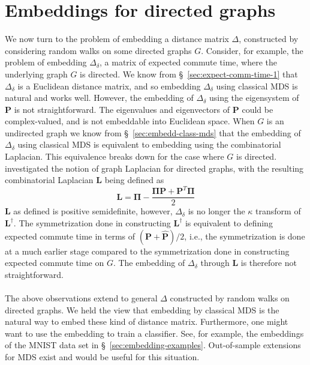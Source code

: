 \section{Embeddings for directed graphs}
\label{sec:embedd-dist-direct}
We now turn to the problem of embedding a distance matrix $\Delta$,
constructed by considering random walks on some directed graphs
$G$. Consider, for example, the problem of embedding $\Delta_{\delta}$,
a matrix of expected commute time, where the underlying graph $G$ is
directed. We know from \S~\ref{sec:expect-comm-time-1} that
$\Delta_{\delta}$ is a Euclidean distance matrix, and so embedding
$\Delta_\delta$ using classical MDS is natural and works
well. However, the embedding of $\Delta_\delta$ using the eigensystem
of $\mathbf{P}$ is not straightforward. The eigenvalues and
eigenvectors of $\mathbf{P}$ could be complex-valued, and is not
embeddable into Euclidean space. When $G$ is an undirected graph we
know from \S~\ref{sec:embedd-class-mds} that the
embedding of $\Delta_{\delta}$ using classical MDS is equivalent to
embedding using the combinatorial Laplacian. This equivalence breaks
down for the case where $G$ is directed. \citet{chung05:_laplac_cheeg}
investigated the notion of graph Laplacian for directed graphs, with the
resulting combinatorial Laplacian $\mathbf{L}$ being defined as
\begin{equation}
  \label{eq:125}
  \mathbf{L} = \bm{\Pi} - \frac{\bm{\Pi}\mathbf{P} + \mathbf{P}^{T}\bm{\Pi}}{2}
\end{equation}
$\mathbf{L}$ as defined is positive semidefinite, however,
$\Delta_{\delta}$ is no longer the $\kappa$ transform of
$\mathbf{L}^{\dagger}$. The symmetrization done in
constructing $\mathbf{L}^{\dagger}$ is equivalent to defining 
expected commute time in terms of $(\mathbf{P} + \hat{\mathbf{P}})/2$,
i.e., the symmetrization is done at a much earlier stage compared to
the symmetrization done in constructing expected commute time on $G$.
The embedding of $\Delta_{\delta}$ through
$\mathbf{L}$ is therefore not straightforward. \\ \\
%
\noindent
The above observations extend to general $\Delta$ constructed by
random walks on directed graphs. We held the view that embedding by
classical MDS is the natural way to embed these kind of distance
matrix. Furthermore, one might want to use the embedding to train a
classifier. See, for example, the embeddings of the MNIST data set in
\S~\ref{sec:embedding-examples}. Out-of-sample extensions for MDS
exist and would be useful for this situation. 
%
